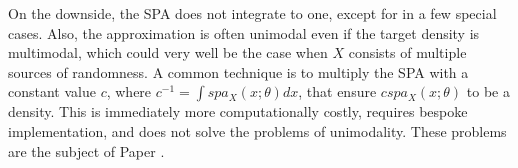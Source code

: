 On the downside, the SPA does not integrate to one, except for in a few special cases.
Also, the approximation is often unimodal even if the target density is multimodal, which could very well be the case when $X$ consists of multiple sources of randomness.
A common technique is to multiply the SPA with a constant value $c$, where $c^{-1}=\int spa_X(x;\theta)dx$, that ensure $cspa_X(x;\theta)$ to be a density.
This is immediately more computationally costly, requires bespoke implementation, and does not solve the problems of unimodality. 
These problems are the subject of Paper .






